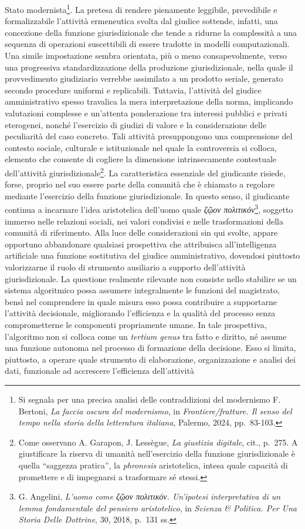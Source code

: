 \documentclass[american,a4paper,]{article}
\begin{document}
Stato modernista\footnote{Si segnala per una precisa analisi delle contraddizioni del modernismo F. Bertoni, \emph{La faccia oscura del modernismo}, in \emph{Frontiere/fratture. Il senso del tempo nella storia della letteratura italiana}, Palermo, 2024, pp.~83-103.}. La pretesa di rendere pienamente leggibile, prevedibile e formalizzabile l'attività ermeneutica svolta dal giudice sottende, infatti, una concezione della funzione giurisdizionale che tende a ridurne la complessità a una sequenza di operazioni suscettibili di essere tradotte in modelli computazionali. Una simile impostazione sembra orientata, più o meno consapevolmente, verso una progressiva standardizzazione della produzione giurisdizionale, nella quale il provvedimento giudiziario verrebbe assimilato a un prodotto seriale, generato secondo procedure uniformi e replicabili. Tuttavia, l'attività del giudice amministrativo spesso travalica la mera interpretazione della norma, implicando valutazioni complesse e un'attenta ponderazione tra interessi pubblici e privati eterogenei, nonché l'esercizio di giudizi di valore e la considerazione delle peculiarità del caso concreto. Tali attività presuppongono una comprensione del contesto sociale, culturale e istituzionale nel quale la controversia si colloca, elemento che consente di cogliere la dimensione intrinsecamente contestuale dell'attività giurisdizionale\footnote{Come osservano A. Garapon, J. Lessègue, \emph{La giustizia digitale}, cit., p.~275. A giustificare la riserva di umanità nell'esercizio della funzione giurisdizionale è quella ``saggezza pratica'', la \emph{phronesis} aristotelica, intesa quale capacità di promettere e di impegnarsi a trasformare sé stessi.}. La caratteristica essenziale del giudicante risiede, forse, proprio nel suo essere parte della comunità che è chiamato a regolare mediante l'esercizio della funzione giurisdizionale. In questo senso, il giudicante continua a incarnare l'idea aristotelica dell'uomo quale \emph{ζῷον πολιτικόν}\footnote{G. Angelini, \emph{L'uomo come ζῷον πολιτικόν. Un'ipotesi interpretativa di un lemma fondamentale del pensiero aristotelico}, in \emph{Scienza \& Politica. Per Una Storia Delle Dottrine}, 30, 2018, p.~131 ss.}, soggetto immerso nelle relazioni sociali, nei valori condivisi e nelle trasformazioni della comunità di riferimento. Alla luce delle considerazioni sin qui svolte, appare opportuno abbandonare qualsiasi prospettiva che attribuisca all'intelligenza artificiale una funzione sostitutiva del giudice amministrativo, dovendosi piuttosto valorizzarne il ruolo di strumento ausiliario a supporto dell'attività giurisdizionale. La questione realmente rilevante non consiste nello stabilire se un sistema algoritmico possa assumere integralmente le funzioni del magistrato, bensì nel comprendere in quale misura esso possa contribuire a supportarne l'attività decisionale, migliorando l'efficienza e la qualità del processo senza comprometterne le componenti propriamente umane. In tale prospettiva, l'algoritmo non si colloca come un \emph{tertium genus} tra fatto e diritto, né assume una funzione autonoma nel processo di formazione della decisione. Esso si limita, piuttosto, a operare quale strumento di elaborazione, organizzazione e analisi dei dati, funzionale ad accrescere l'efficienza dell'attività 
\end{document}
